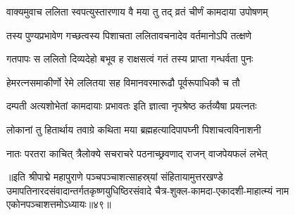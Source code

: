 \twolineshloka
{वाक्यमुवाच ललिता स्वपत्युस्तारणाय वै}
{मया तु तद् व्रतं चीर्णं कामदाया उपोषणम्}%

\twolineshloka
{तस्य पुण्यप्रभावेण गच्छत्वस्य पिशाचता}
{ललितावचनादेव वर्तमानोऽपि तत्क्षणे}%

\twolineshloka
{गतपापः स ललितो दिव्यदेहो बभूव ह}
{राक्षसत्वं गतं तस्य प्राप्ता गन्धर्वता पुनः}%

\twolineshloka
{हेमरत्नसमाकीर्णो रेमे ललितया सह}
{विमानवरमारूढौ पूर्वरूपाधिकौ च तौ}%

\twolineshloka
{दम्पती अत्यशोभेतां कामदायाः प्रभावतः}
{इति ज्ञात्वा नृपश्रेष्ठ कर्तव्यैषा प्रयत्नतः}%

\twolineshloka
{लोकानां तु हितार्थाय तवाग्रे कथिता मया}
{ब्रह्महत्यादिपापघ्नी पिशाचत्वविनाशनी}%

\twolineshloka
{नातः परतरा काचित् त्रैलोक्ये सचराचरे}
{पठनाच्छ्रवणाद् राजन् वाजपेयफलं लभेत्}%

॥इति श्रीपाद्मे महापुराणे पञ्चपञ्चाशत्साहस्र्यां संहितायामुत्तरखण्डे उमापतिनारदसंवादान्तर्गतकृष्णयुधिष्ठिरसंवादे चैत्र-शुक्ल-कामदा-एकादशी-माहात्म्यं नाम एकोनपञ्चाशत्तमोऽध्यायः॥४९॥

\genMangalaShloka

\hyperref[sec:ekadashi_mahatmyam_padma_puranam]{\closesub}
\clearpage

